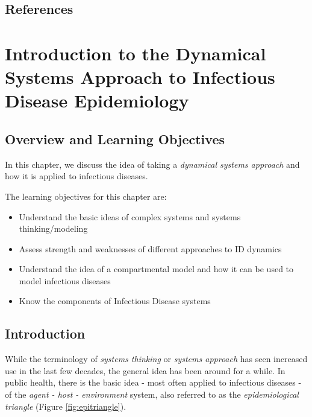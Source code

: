 \documentclass[]{article}
\providecommand{\tightlist}{%
  \setlength{\itemsep}{0pt}\setlength{\parskip}{0pt}}
\theoremstyle{definition}
\theoremstyle{definition}
\theoremstyle{definition}
\theoremstyle{remark}
\begin{document}
\subsection{References}\label{references}

\section{Introduction to the Dynamical Systems Approach to Infectious
Disease
Epidemiology}\label{introduction-to-the-dynamical-systems-approach-to-infectious-disease-epidemiology}

\subsection{Overview and Learning
Objectives}\label{overview-and-learning-objectives}

In this chapter, we discuss the idea of taking a \emph{dynamical systems
approach} and how it is applied to infectious diseases.

The learning objectives for this chapter are:

\begin{itemize}
\tightlist
\item
  Understand the basic ideas of complex systems and systems
  thinking/modeling
\item
  Assess strength and weaknesses of different approaches to ID dynamics
\item
  Understand the idea of a compartmental model and how it can be used to
  model infectious diseases
\item
  Know the components of Infectious Disease systems
\end{itemize}

\subsection{Introduction}\label{introduction}

While the terminology of \emph{systems thinking} or \emph{systems
approach} has seen increased use in the last few decades, the general
idea has been around for a while. In public health, there is the basic
idea - most often applied to infectious diseases - of the \emph{agent -
host - environment} system, also referred to as the
\emph{epidemiological triangle} (Figure \ref{fig:epitriangle}).
\end{document}
